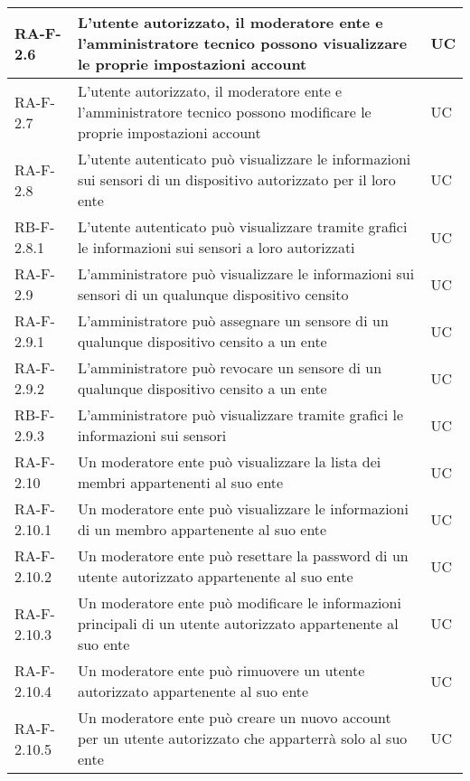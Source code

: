\begin{center}
\begin{longtable}{|p{3cm}|p{9.85cm}|p{2cm}|}
		{\color{gray} RA-F-}2.6 & L'utente autorizzato, il moderatore ente e l'amministratore tecnico possono visualizzare le proprie impostazioni account & UC \\ \hline
		{\color{gray} RA-F-}2.7 & L'utente autorizzato, il moderatore ente e l'amministratore tecnico possono modificare le proprie impostazioni account & UC \\ \hline
		
		{\color{gray} RA-F-}2.8 & L'utente autenticato può visualizzare le informazioni sui sensori di un dispositivo autorizzato per il loro ente & UC \\ \hline
		{\color{gray} RB-F-}2.8.1 & L'utente autenticato può visualizzare tramite grafici le informazioni sui sensori a loro autorizzati & UC \\ \hline
		{\color{gray} RA-F-}2.9 & L'amministratore può visualizzare le informazioni sui sensori di un qualunque dispositivo censito & UC \\ \hline
		{\color{gray} RA-F-}2.9.1 & L'amministratore può assegnare un sensore di un qualunque dispositivo censito a un ente & UC \\ \hline
		{\color{gray} RA-F-}2.9.2 & L'amministratore può revocare un sensore di un qualunque dispositivo censito a un ente & UC \\ \hline
		{\color{gray} RB-F-}2.9.3 & L'amministratore può visualizzare tramite grafici le informazioni sui sensori & UC \\ \hline

		{\color{gray} RA-F-}2.10 & Un moderatore ente può visualizzare la lista dei membri appartenenti al suo ente & UC \\ \hline
		{\color{gray} RA-F-}2.10.1 & Un moderatore ente può visualizzare le informazioni di un membro appartenente al suo ente & UC \\ \hline
		{\color{gray} RA-F-}2.10.2 & Un moderatore ente può resettare la password di un utente autorizzato appartenente al suo ente & UC \\ \hline
		{\color{gray} RA-F-}2.10.3 & Un moderatore ente può modificare le informazioni principali di un utente autorizzato appartenente al suo ente & UC \\ \hline
		{\color{gray} RA-F-}2.10.4 & Un moderatore ente può rimuovere un utente autorizzato appartenente al suo ente & UC \\ \hline
		{\color{gray} RA-F-}2.10.5 & Un moderatore ente può creare un nuovo account per un utente autorizzato che apparterrà solo al suo ente & UC \\ \hline


\end{longtable}
\end{center}
